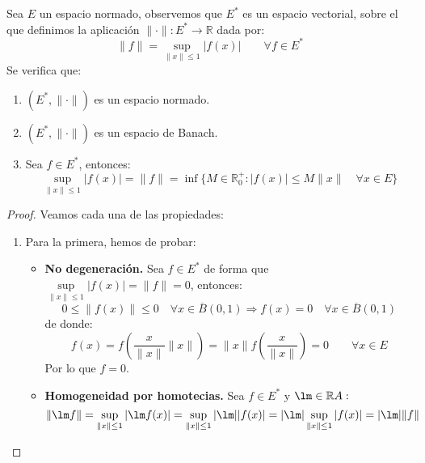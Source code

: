 \begin{prop}
    Sea $E$ un espacio normado, observemos que $E^\ast$ es un espacio vectorial, sobre el que definimos la aplicación $\|\cdot \|:E^\ast \to \mathbb{R}$ dada por:
    \begin{equation*}
        \|f\| = \sup_{\|x\| \leq 1} |f(x)| \qquad \forall f\in E^\ast
    \end{equation*}
    Se verifica que:
    \begin{enumerate}
        \item $(E^\ast, \|\cdot \|)$ es un espacio normado.
        \item $(E^\ast, \|\cdot \|)$ es un espacio de Banach.
        \item Sea $f\in E^\ast$, entonces:
            \begin{equation*}
                \sup_{\|x\| \leq 1} |f(x)| = \|f\| = \inf \{M\in \mathbb{R}^+_0 : |f(x)| \leq M\|x\| \quad \forall x\in E\}
            \end{equation*}
    \end{enumerate}
    \begin{proof}
        Veamos cada una de las propiedades:
        \begin{enumerate}
            \item Para la primera, hemos de probar:
                \begin{itemize}
                    \item \textbf{No degeneración.} Sea $f\in E^\ast$ de forma que $\sup\limits_{\|x\|\leq 1}|f(x)| = \|f\| = 0$, entonces:
                        \begin{equation*}
                            0\leq \|f(x)\|\leq 0 \quad \forall x\in \overline{B}(0,1) \Longrightarrow f(x) = 0 \quad \forall x\in \overline{B}(0,1)
                        \end{equation*}
                        de donde:
                        \begin{equation*}
                            f(x) = f\left(\dfrac{x}{\|x\|}\|x\|\right) = \|x\| f\left(\dfrac{x}{\|x\|}\right) = 0 \qquad \forall x\in E
                        \end{equation*}
                        Por lo que $f = 0$.
                    \item \textbf{Homogeneidad por homotecias.} Sea $f\in E^\ast$ y $\lm\in \mathbb{R}A:$
                        \begin{equation*}
                            \|\lm f\| = \sup_{\|x\|\leq 1} |\lm f(x)|  = \sup_{\|x\|\leq 1} |\lm||f(x)| = |\lm| \sup_{\|x\|\leq 1}|f(x)| = |\lm| \|f\|

\end{equation*}
\end{itemize}
\end{enumerate}
\end{proof}
\end{prop}
